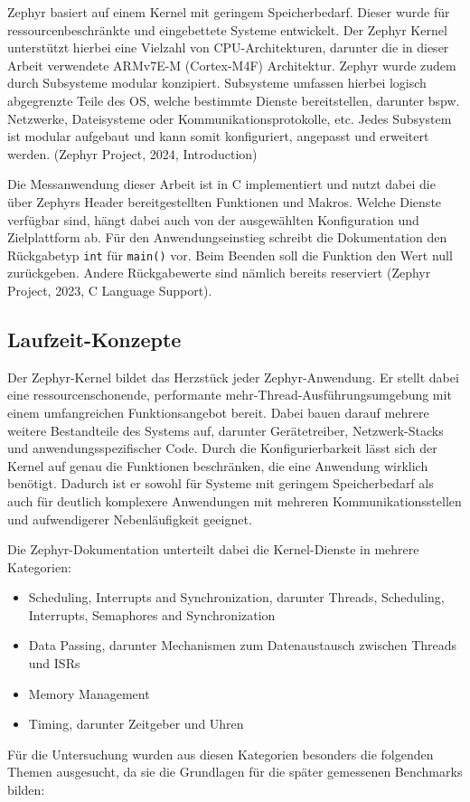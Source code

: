 Zephyr basiert auf einem Kernel mit geringem Speicherbedarf. Dieser wurde f{\"u}r ressourcenbeschr{\"a}nkte und eingebettete Systeme entwickelt. Der Zephyr Kernel unterst{\"u}tzt hierbei eine Vielzahl von CPU-Architekturen, darunter die in dieser Arbeit verwendete ARMv7E-M (Cortex-M4F) Architektur. Zephyr wurde zudem durch Subsysteme modular konzipiert. Subsysteme umfassen hierbei logisch abgegrenzte Teile des OS, welche bestimmte Dienste bereitstellen, darunter bspw. Netzwerke, Dateisysteme oder Kommunikationsprotokolle, etc. Jedes Subsystem ist modular aufgebaut und kann somit konfiguriert, angepasst und erweitert werden. (Zephyr Project, 2024, \glqq{}Introduction\grqq{})

Die Messanwendung dieser Arbeit ist in C implementiert und nutzt dabei die {\"u}ber Zephyrs Header bereitgestellten Funktionen und Makros. Welche Dienste verf{\"u}gbar sind, h{\"a}ngt dabei auch von der ausgew{\"a}hlten Konfiguration und Zielplattform ab. F{\"u}r den Anwendungseinstieg schreibt die Dokumentation den R{\"u}ckgabetyp \lstinline[style=fileinline]|int| f{\"u}r \lstinline[style=fileinline]|main()| vor. Beim Beenden soll die Funktion den Wert null zur{\"u}ckgeben. Andere R{\"u}ckgabewerte sind n{\"a}mlich bereits reserviert (Zephyr Project, 2023, \glqq{}C Language Support\grqq{}).

\subsection{Laufzeit-Konzepte}
Der Zephyr-Kernel bildet das Herzst{\"u}ck jeder Zephyr-Anwendung. Er stellt dabei eine ressourcenschonende, performante mehr-Thread-Ausf{\"u}hrungsumgebung mit einem umfangreichen Funktionsangebot bereit. Dabei bauen darauf mehrere weitere Bestandteile des Systems auf, darunter Ger{\"a}tetreiber, Netzwerk-Stacks und anwendungsspezifischer Code. Durch die Konfigurierbarkeit l{\"a}sst sich der Kernel auf genau die Funktionen beschr{\"a}nken, die eine Anwendung wirklich ben{\"o}tigt. Dadurch ist er sowohl f{\"u}r Systeme mit geringem Speicherbedarf als auch f{\"u}r deutlich komplexere Anwendungen mit mehreren Kommunikationsstellen und aufwendigerer Nebenl{\"a}ufigkeit geeignet.

Die Zephyr-Dokumentation unterteilt dabei die Kernel-Dienste in mehrere Kategorien:

\begin{itemize}
\item \glqq{}Scheduling, Interrupts and Synchronization\grqq{}, darunter Threads, Scheduling, Interrupts, Semaphores and Synchronization
\item \glqq{}Data Passing\grqq{}, darunter Mechanismen zum Datenaustausch zwischen Threads und ISRs
\item \glqq{}Memory Management\grqq{}
\item \glqq{}Timing\grqq{}, darunter Zeitgeber und Uhren
\end{itemize}
F{\"u}r die Untersuchung wurden aus diesen Kategorien besonders die folgenden Themen ausgesucht, da sie die Grundlagen f{\"u}r die sp{\"a}ter gemessenen Benchmarks bilden:

